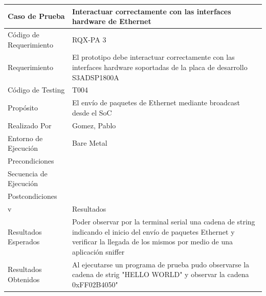 \begin{table}[!h]
		\centering
		\begin{tabular}{ p{5cm} p{10cm}  }
		\hline 
	\rowcolor[gray]{0.8}  Caso de Prueba&  Interactuar correctamente con las interfaces hardware de Ethernet\\
		\hline 
		Código de Requerimiento & RQX-PA 3\\ 
		\hline 
		Requerimiento  &  El prototipo debe interactuar correctamente con las interfaces hardware soportadas de la placa de desarrollo S3ADSP1800A\\ 
		\hline 
		Código de Testing & T004\\ 
		\hline
		Propósito &  El envío de paquetes de Ethernet mediante broadcast desde el SoC  \\
		\hline
		Realizado Por & Gomez, Pablo \\
		\hline	
		Entorno de Ejecución & Bare Metal \\
		\hline
		Precondiciones &  \\
		\hline
		Secuencia de Ejecución &  \\
		\hline
		Postcondiciones & \\
		\hline
		\rowcolor[gray]{0.8}  v&Resultados\\
		\hline
		Resultados Esperados & Poder observar por la terminal serial una cadena de string indicando el inicio del envío de paquetes Ethernet y verificar la llegada de los mismos por medio de una aplicación sniffer \\
		\hline	
		Resultados Obtenidos & Al ejecutarse un programa de prueba pudo observarse la cadena de strig "HELLO WORLD" y observar la cadena 0xFF02B4050" \\
		\hline
		\end{tabular}
		\end{table}


